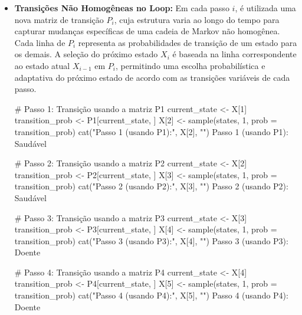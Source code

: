 \documentclass[12pt]{article}
\theoremstyle{break}
\begin{document}
\begin{itemize}
\begin{RCodeBox}
# Número de passos
n <- 5

# Inicializando a simulação
set.seed(123)  # Para resultados reproduzíveis
X <- character(n + 1)

# Passo 0: Estado inicial baseado na distribuição alpha
X[1] <- sample(states, 1, prob = alpha)
cat("Passo 0 (Estado inicial):", X[1], "\n")
Passo 0 (Estado inicial): Saudável 
\end{RCodeBox}



    

\item \textbf{Transições Não Homogêneas no Loop:} Em cada passo \( i \), é utilizada uma nova matriz de transição \( P_i \), cuja estrutura varia ao longo do tempo para capturar mudanças específicas de uma cadeia de Markov não homogênea. Cada linha de \( P_i \) representa as probabilidades de transição de um estado para os demais. A seleção do próximo estado \( X_i \) é baseada na linha correspondente ao estado atual \( X_{i-1} \) em \( P_i \), permitindo uma escolha probabilística e adaptativa do próximo estado de acordo com as transições variáveis de cada passo.




\begin{RCodeBox}

# Passo 1: Transição usando a matriz P1
current_state <- X[1]
transition_prob <- P1[current_state, ]
X[2] <- sample(states, 1, prob = transition_prob)
cat("Passo 1 (usando P1):", X[2], "\n")
Passo 1 (usando P1): Saudável 

# Passo 2: Transição usando a matriz P2
current_state <- X[2]
transition_prob <- P2[current_state, ]
X[3] <- sample(states, 1, prob = transition_prob)
cat("Passo 2 (usando P2):", X[3], "\n")
Passo 2 (usando P2): Saudável 

# Passo 3: Transição usando a matriz P3
current_state <- X[3]
transition_prob <- P3[current_state, ]
X[4] <- sample(states, 1, prob = transition_prob)
cat("Passo 3 (usando P3):", X[4], "\n")
Passo 3 (usando P3): Doente 

# Passo 4: Transição usando a matriz P4
current_state <- X[4]
transition_prob <- P4[current_state, ]
X[5] <- sample(states, 1, prob = transition_prob)
cat("Passo 4 (usando P4):", X[5], "\n")
Passo 4 (usando P4): Doente

\end{RCodeBox}






\end{itemize}
\end{document}
